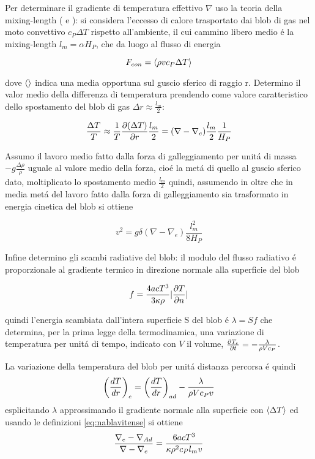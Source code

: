 \documentclass[../main.tex]{subfiles}
\begin{document}
Per determinare il gradiente di temperatura effettivo $\nabla$ uso la teoria della mixing-length (\cite{prandtl25tur} e \cite{vitense53kon}):
si considera l'eccesso di calore trasportato dai blob di gas nel moto convettivo $c_P\Delta T$ rispetto all'ambiente, il cui cammino libero medio \'e la mixing-length $l_m=\alpha H_P$, che da luogo al flusso di energia

\begin{equation}
F_{con}=\exv{\rho vc_P\Delta T}\label{eq:convectiveflux}
\end{equation}

dove $\exv{}$ indica una media opportuna sul guscio sferico di raggio r. Determino il valor medio della differenza di temperatura prendendo come valore caratteristico dello spostamento del blob di gas $\Delta r\approx\frac{l_m}{2}$:

\begin{equation}
\frac{\Delta T}{T}\approx\frac{1}{T}\PDy{r}{(\Delta T)}\frac{l_m}{2}=(\nabla-\nabla_e)\frac{l_m}{2}\frac{1}{H_P}
\end{equation}

Assumo il lavoro medio fatto dalla forza di galleggiamento per unit\'a di massa $-g\frac{\Delta\rho}{\rho}$ uguale al valore medio della forza, cio\'e la met\'a di quello al guscio sferico dato, moltiplicato lo spostamento medio $\frac{l_m}{2}$ quindi, assumendo in oltre che in media met\'a del lavoro fatto dalla forza di galleggiamento sia trasformato in energia cinetica del blob si ottiene

\begin{equation}
v^2=g\delta(\nabla-\nabla_e)\frac{l_m^2}{8H_P}\label{eq:blobvelocity}
\end{equation}

Infine determino gli scambi radiative del blob: il modulo del flusso radiativo \'e proporzionale al gradiente termico in direzione normale alla superficie del blob

\begin{equation}
f=\frac{4acT^3}{3\kappa\rho}|\PDy{n}{T}|
\end{equation}

quindi l'energia scambiata dall'intera superficie S del blob \'e $\lambda=Sf$ che determina, per la prima legge della termodinamica, una variazione di temperatura per unit\'a di tempo, indicato con $V$ il volume, $\PDy{t}{T_e}=-\frac{\lambda}{\rho Vc_P}$.

La variazione della temperatura del blob per unit\'a distanza percorsa \'e quindi
\begin{equation}
\Dcvar{\TDy{r}{T}}{e}=\Dcvar{\TDy{r}{T}}{ad}-\frac{\lambda}{\rho Vc_Pv}\label{eq:Tchangelength}
\end{equation}
esplicitando $\lambda$ approssimando il gradiente normale alla superficie con $\exv{\Delta T}$ ed usando le definizioni \eqref{eq:nablavitense} si ottiene
\begin{equation}
\frac{\nabla_e-\nad{}}{\nabla-\nabla_e}=\frac{6acT^3}{\kappa\rho^2c_Pl_mv}
\end{equation}
\end{document}
